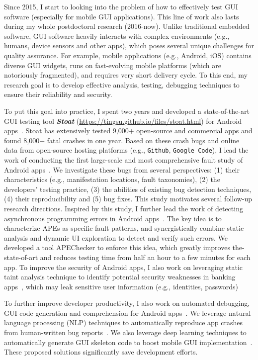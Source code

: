 \documentclass[a4paper]{article}
\begin{document}
Since 2015, I start to looking into the problem of how to effectively test GUI software (especially for mobile GUI applications). This line of work also lasts during my whole postdoctoral research (2016-now).
Unlike traditional embedded software, GUI software heavily interacts with complex environments (e.g., humans, device sensors and other apps), which poses several unique challenges for quality assurance.
For example, mobile applications (e.g., Android, iOS) contains diverse GUI widgets, runs on fast-evolving mobile platforms (which are notoriously fragmented), and requires very short delivery cycle. To this end, my research goal is to develop effective analysis, testing, debugging techniques to ensure their reliability and security.

To put this goal into practice, I spent two years and developed a state-of-the-art GUI testing tool \emph{\textbf{Stoat}} (\url{https://tingsu.github.io/files/stoat.html}) for Android apps~\cite{stoat}. Stoat has extensively tested 9,000+ open-source and commercial apps and found 8,000+ fatal crashes in one year. 
Based on these crash bugs and online data from open-source hosting platforms (e.g., \texttt{Github}, \texttt{Google Code}), I lead the work of conducting the first large-scale and most comprehensive fault study of Android apps~\cite{study,study2}. We investigate these bugs from several perspectives: (1)
their characteristics (e.g., manifestation locations, fault taxonomies), (2) the developers’ testing practice, (3) the abilities of existing bug
detection techniques, (4) their reproducibility and (5) bug fixes. This study motivates several follow-up research directions.
Inspired by this study, I further lead the work of detecting asynchronous programming errors in Android apps~\cite{apechecker}. The key idea is to characterize APEs as specific fault patterns, and synergistically combine static analysis and dynamic UI exploration to detect and verify such errors.
We developed a tool APEChecker to enforce this idea, which greatly improves the-state-of-art and reduces testing time from half an hour to a few minutes for each app. 
To improve the security of Android apps, I also work on leveraging static taint analysis technique to identify potential security weaknesses in banking apps~\cite{ausera}, which may leak sensitive user information (e.g., identities, passwords)

To further improve developer productivity, I also work on automated debugging, GUI code generation and comprehension for Android apps~\cite{recdroid,ui2code,storydroid}.
We leverage natural language processing (NLP) techniques to automatically reproduce app crashes from human-written bug reports~\cite{recdroid}.
We also leverage deep learning techniques to automatically generate GUI skeleton code to boost mobile GUI implementation~\cite{ui2code}.
These proposed solutions significantly save development efforts.
\end{document}
